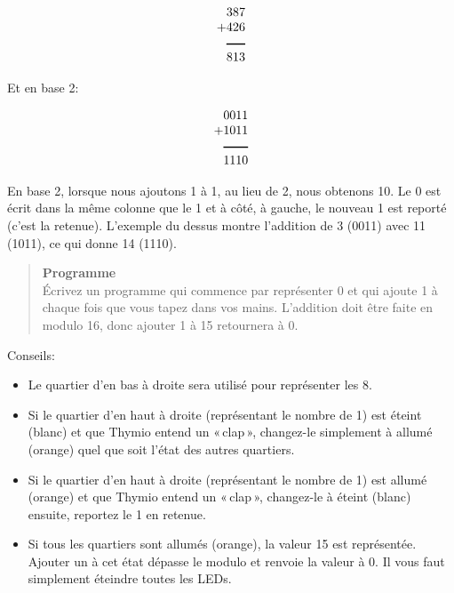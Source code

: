 \begin{displaymath}
\begin{array}{r}
387\\
+426\\
\rule[1pt]{1.5em}{1pt}\\
813\\
\end{array}
\end{displaymath}

Et en base 2:

\begin{displaymath}
\begin{array}{r}
0011\\
+1011\\
\rule[1pt]{2em}{1pt}\\
1110\\
\end{array}
\end{displaymath}

En base 2, lorsque nous ajoutons 1 à 1, au lieu de 2, nous obtenons 10. Le 0 est écrit dans la même colonne que le 1 et à côté, à gauche, le nouveau 1 est reporté (c'est la retenue). L'exemple du dessus montre l'addition de 3 (0011) avec 11 (1011), ce qui donne 14 (1110).

\begin{quote}
\textbf{Programme}\\
Écrivez un programme qui commence par représenter 0 et qui ajoute 1 à chaque fois que vous tapez dans vos mains. L'addition doit être faite en modulo 16, donc ajouter 1 à 15 retournera à 0.
\end{quote}

Conseils:

\begin{itemize}
\item Le quartier d'en bas à droite sera utilisé pour représenter les 8.
\item Si le quartier d'en haut à droite (représentant le nombre de 1) est éteint (blanc) et que Thymio entend un «\,clap\,», changez-le simplement à allumé (orange) quel que soit l'état des autres quartiers.
\item Si le quartier d'en haut à droite (représentant le nombre de 1) est allumé (orange) et que Thymio entend un «\,clap\,», changez-le à éteint (blanc) ensuite, reportez le 1 en retenue.
\item Si tous les quartiers sont allumés (orange), la valeur 15 est représentée. Ajouter un à cet état dépasse le modulo et renvoie la valeur à 0. Il vous faut simplement éteindre toutes les LEDs.
\end{itemize}


